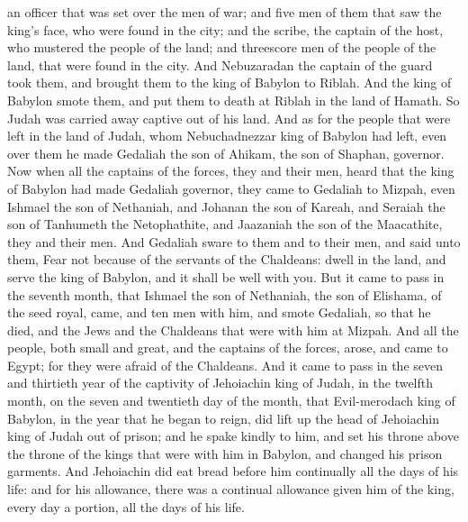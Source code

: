an officer that was set over the men of war; and five men of them that saw the king’s face, who were found in the city; and the scribe, the captain of the host, who mustered the people of the land; and threescore men of the people of the land, that were found in the city. And Nebuzaradan the captain of the guard took them, and brought them to the king of Babylon to Riblah. And the king of Babylon smote them, and put them to death at Riblah in the land of Hamath. So Judah was carried away captive out of his land.  And as for the people that were left in the land of Judah, whom Nebuchadnezzar king of Babylon had left, even over them he made Gedaliah the son of Ahikam, the son of Shaphan, governor. Now when all the captains of the forces, they and their men, heard that the king of Babylon had made Gedaliah governor, they came to Gedaliah to Mizpah, even Ishmael the son of Nethaniah, and Johanan the son of Kareah, and Seraiah the son of Tanhumeth the Netophathite, and Jaazaniah the son of the Maacathite, they and their men. And Gedaliah sware to them and to their men, and said unto them, Fear not because of the servants of the Chaldeans: dwell in the land, and serve the king of Babylon, and it shall be well with you. But it came to pass in the seventh month, that Ishmael the son of Nethaniah, the son of Elishama, of the seed royal, came, and ten men with him, and smote Gedaliah, so that he died, and the Jews and the Chaldeans that were with him at Mizpah. And all the people, both small and great, and the captains of the forces, arose, and came to Egypt; for they were afraid of the Chaldeans.  And it came to pass in the seven and thirtieth year of the captivity of Jehoiachin king of Judah, in the twelfth month, on the seven and twentieth day of the month, that Evil-merodach king of Babylon, in the year that he began to reign, did lift up the head of Jehoiachin king of Judah out of prison; and he spake kindly to him, and set his throne above the throne of the kings that were with him in Babylon, and changed his prison garments. And Jehoiachin did eat bread before him continually all the days of his life: and for his allowance, there was a continual allowance given him of the king, every day a portion, all the days of his life. 